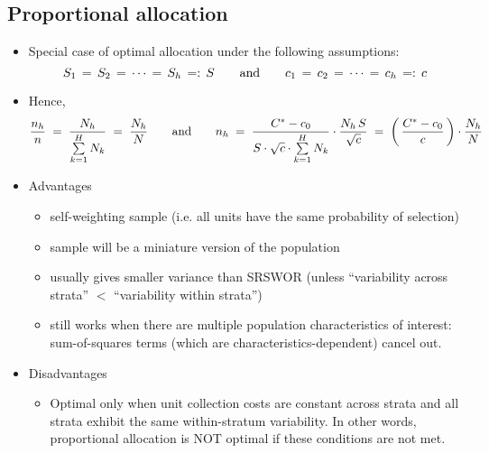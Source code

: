 
          
\subsection{Proportional allocation}

\begin{itemize}
\item
	Special case of optimal allocation under the following assumptions:
	\begin{equation*}
	S_{1} \,=\, S_{2} \,=\, \cdots \,=\, S_{h} \, =: \, S
	\quad\quad
	\textnormal{and}
	\quad\quad
	c_{1} \,=\, c_{2} \,=\, \cdots \,=\, c_{h} \, =: \, c
	\end{equation*}
\item
	Hence,
	\begin{equation*}
	\dfrac{n_{h}}{n} \; = \; \dfrac{N_{h}}{\overset{H}{\underset{k=1}{\sum}}\,N_{k}} \; = \; \dfrac{N_{h}}{N}
	\quad\quad
	\textnormal{and}
	\quad\quad
	n_{h}
	\; = \;
		\dfrac{C^{*} - c_{0}}{S\cdot\sqrt{c}\cdot\overset{H}{\underset{k=1}{\sum}}\,N_{k}}
		\cdot
		\dfrac{N_{h}\,S}{\sqrt{c}}
	\; = \;
		\left(\,\dfrac{C^{*} - c_{0}}{c}\,\right) \cdot \dfrac{N_{h}}{N}
	\end{equation*}
\item
	Advantages
	\begin{itemize}
	\item
		self-weighting sample (i.e. all units have the same probability of selection)
	\item
		sample will be a miniature version of the population
	\item
		usually gives smaller variance than SRSWOR
		\vskip 0.05cm
		(unless ``variability across strata'' $<$ ``variability within strata'')
	\item
		still works when there are multiple population characteristics of interest:
		sum-of-squares terms (which are characteristics-dependent) cancel out.
	\end{itemize}
\item
	Disadvantages
	\begin{itemize}
	\item
		Optimal only when unit collection costs are constant across strata and
		all strata exhibit the same within-stratum variability.
		In other words, proportional allocation is NOT optimal if these conditions
		are not met.
	\end{itemize}
\end{itemize}


